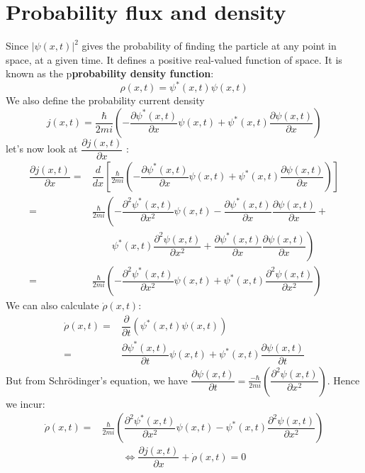   \section{Probability flux and density }
  Since $| \psi (x,t)|^2 $ gives the probability of finding the particle at any point in space, at a given time. It defines a positive real-valued function of space. It is known as the p\textbf{probability density function}:
  \begin{equation}
  \rho (x,t) = \psi^* (x,t) \psi (x,t)
  \end{equation}
  We also define the probability current density 
  \begin{equation}
  j(x,t) = \frac{\hbar}{2mi}\left( -\dfrac{\partial \psi^* (x,t)}{\partial x} \psi (x,t) + \psi^* (x,t)\dfrac{\partial \psi (x,t)}{\partial x} \right) 
  \end{equation}
  let's now look at $ \dfrac{\partial j (x,t)}{\partial   x}$ :
  \begin{align}
  \dfrac{\partial j (x,t)}{\partial x} =& \dfrac{d}{dx}\left[ \frac{\hbar}{2mi}\left( -\dfrac{\partial \psi^* (x,t)}{\partial x} \psi (x,t) + \psi^* (x,t)\dfrac{\partial \psi (x,t)}{\partial x} \right) \right] \nonumber \\
  =& \frac{\hbar}{2mi}\left( -\dfrac{\partial^2 \psi^* (x,t)}{\partial x^2} \psi (x,t) - \dfrac{\partial \psi^* (x,t)}{\partial x} \dfrac{\partial \psi (x,t) }{\partial x } +\right.\nonumber \\ 
  &\qquad\left. {} \psi^* (x,t)\dfrac{\partial ^2 \psi (x,t)}{\partial x^2} +  \dfrac{\partial \psi^* (x,t)}{\partial x} \dfrac{\partial \psi (x,t) }{\partial x }\right) \nonumber \\
  =& \frac{\hbar}{2mi}\left( -\dfrac{\partial^2 \psi^* (x,t)}{\partial x^2} \psi (x,t) + \psi^* (x,t)\dfrac{\partial^2 \psi (x,t)}{\partial x^2} \right) 
  \end{align}
  We can also calculate $ \dot{\rho}(x,t)$:
  \begin{align}
  \dot{\rho}(x,t) =& \dfrac{\partial }{\partial t }\left( \psi^* (x,t) \psi (x,t)\right) \nonumber \\
  =&  \dfrac{\partial \psi^* (x,t) }{\partial t } \psi (x,t) + \psi^* (x,t) \dfrac{\partial \psi (x,t) }{\partial t }
  \end{align}
  But from Schr\"{o}dinger's equation, we have $ \dfrac{\partial \psi (x,t) }{\partial t } = \frac{-\hbar}{2m i }\left(  \dfrac{\partial^2 \psi (x,t)}{\partial x^2}\right) $. Hence we incur:
  \begin{align}
  \dot{\rho}(x,t) =& \frac{\hbar}{2mi}\left( \dfrac{\partial^2 \psi^* (x,t)}{\partial x^2} \psi (x,t) - \psi^* (x,t)\dfrac{\partial^2 \psi (x,t)}{\partial x^2} \right)
  \end{align}
  \begin{equation}
  \Leftrightarrow \dfrac{\partial j (x,t)}{\partial x} + \dot{\rho}(x,t)=0
  \end{equation}
  
